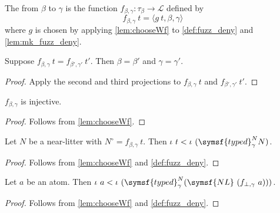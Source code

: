 \begin{definition}
    The  from \( \beta \) to \( \gamma \) is the function \( f_{\beta,\gamma} : \tau_\beta \to \mathcal L \) defined by
    \[ f_{\beta,\gamma}\ t = \langle g\ t, \beta, \gamma \rangle \]
    where \( g \) is chosen by applying \cref{lem:chooseWf} to \cref{def:fuzz_deny} and \cref{lem:mk_fuzz_deny}.
\end{definition}
\begin{lemma}
    \label{lem:fuzz_congr}
    Suppose \( f_{\beta,\gamma}\ t = f_{\beta',\gamma'}\ t' \).
    Then \( \beta = \beta' \) and \( \gamma = \gamma' \).
\end{lemma}
\begin{proof}
    Apply the second and third projections to \( f_{\beta,\gamma}\ t \) and \( f_{\beta',\gamma'}\ t' \).
\end{proof}
\begin{lemma}
    \label{lem:fuzz_injective}
    \( f_{\beta,\gamma} \) is injective.
\end{lemma}
\begin{proof}
    Follows from \cref{lem:chooseWf}.
\end{proof}
\begin{lemma}
    \label{lem:fuzz_pos}
    Let \( N \) be a near-litter with \( N^\circ = f_{\beta,\gamma}\ t \).
    Then \( \iota\ t < \iota\ (\symsf{typed}^N_\gamma N) \).
\end{lemma}
\begin{proof}
    Follows from \cref{lem:chooseWf} and \cref{def:fuzz_deny}.
\end{proof}
\begin{lemma}
    \label{lem:pos_atom_lt_fuzz}
    Let \( a \) be an atom.
    Then \( \iota\ a < \iota\ (\symsf{typed}^N_\gamma (\symsf{NL}\ (f_{\bot,\gamma}\ a))) \).
\end{lemma}
\begin{proof}
    Follows from \cref{lem:chooseWf} and \cref{def:fuzz_deny}.
\end{proof}

